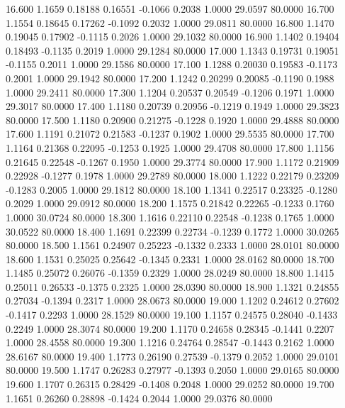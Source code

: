   16.600   1.1659   0.18188   0.16551  -0.1066   0.2038   1.0000  29.0597  80.0000
  16.700   1.1554   0.18645   0.17262  -0.1092   0.2032   1.0000  29.0811  80.0000
  16.800   1.1470   0.19045   0.17902  -0.1115   0.2026   1.0000  29.1032  80.0000
  16.900   1.1402   0.19404   0.18493  -0.1135   0.2019   1.0000  29.1284  80.0000
  17.000   1.1343   0.19731   0.19051  -0.1155   0.2011   1.0000  29.1586  80.0000
  17.100   1.1288   0.20030   0.19583  -0.1173   0.2001   1.0000  29.1942  80.0000
  17.200   1.1242   0.20299   0.20085  -0.1190   0.1988   1.0000  29.2411  80.0000
  17.300   1.1204   0.20537   0.20549  -0.1206   0.1971   1.0000  29.3017  80.0000
  17.400   1.1180   0.20739   0.20956  -0.1219   0.1949   1.0000  29.3823  80.0000
  17.500   1.1180   0.20900   0.21275  -0.1228   0.1920   1.0000  29.4888  80.0000
  17.600   1.1191   0.21072   0.21583  -0.1237   0.1902   1.0000  29.5535  80.0000
  17.700   1.1164   0.21368   0.22095  -0.1253   0.1925   1.0000  29.4708  80.0000
  17.800   1.1156   0.21645   0.22548  -0.1267   0.1950   1.0000  29.3774  80.0000
  17.900   1.1172   0.21909   0.22928  -0.1277   0.1978   1.0000  29.2789  80.0000
  18.000   1.1222   0.22179   0.23209  -0.1283   0.2005   1.0000  29.1812  80.0000
  18.100   1.1341   0.22517   0.23325  -0.1280   0.2029   1.0000  29.0912  80.0000
  18.200   1.1575   0.21842   0.22265  -0.1233   0.1760   1.0000  30.0724  80.0000
  18.300   1.1616   0.22110   0.22548  -0.1238   0.1765   1.0000  30.0522  80.0000
  18.400   1.1691   0.22399   0.22734  -0.1239   0.1772   1.0000  30.0265  80.0000
  18.500   1.1561   0.24907   0.25223  -0.1332   0.2333   1.0000  28.0101  80.0000
  18.600   1.1531   0.25025   0.25642  -0.1345   0.2331   1.0000  28.0162  80.0000
  18.700   1.1485   0.25072   0.26076  -0.1359   0.2329   1.0000  28.0249  80.0000
  18.800   1.1415   0.25011   0.26533  -0.1375   0.2325   1.0000  28.0390  80.0000
  18.900   1.1321   0.24855   0.27034  -0.1394   0.2317   1.0000  28.0673  80.0000
  19.000   1.1202   0.24612   0.27602  -0.1417   0.2293   1.0000  28.1529  80.0000
  19.100   1.1157   0.24575   0.28040  -0.1433   0.2249   1.0000  28.3074  80.0000
  19.200   1.1170   0.24658   0.28345  -0.1441   0.2207   1.0000  28.4558  80.0000
  19.300   1.1216   0.24764   0.28547  -0.1443   0.2162   1.0000  28.6167  80.0000
  19.400   1.1773   0.26190   0.27539  -0.1379   0.2052   1.0000  29.0101  80.0000
  19.500   1.1747   0.26283   0.27977  -0.1393   0.2050   1.0000  29.0165  80.0000
  19.600   1.1707   0.26315   0.28429  -0.1408   0.2048   1.0000  29.0252  80.0000
  19.700   1.1651   0.26260   0.28898  -0.1424   0.2044   1.0000  29.0376  80.0000
